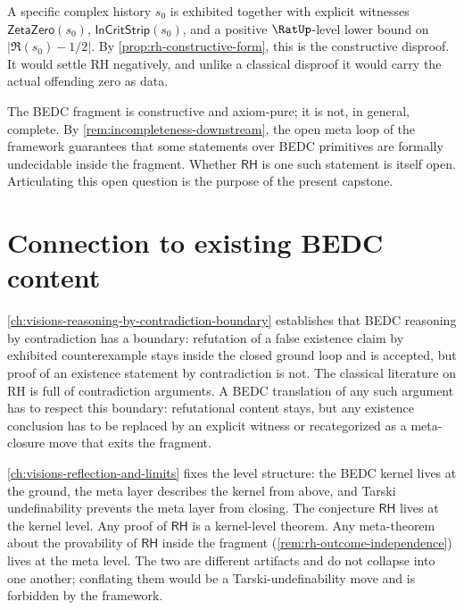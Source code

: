 \begin{remark}
\label{rem:rh-outcome-counterexample}
A specific complex history $s_0$ is exhibited together with explicit witnesses $\mathsf{ZetaZero}(s_0)$, $\mathsf{InCritStrip}(s_0)$, and a positive $\RatUp$-level lower bound on $|\Re(s_0) - 1/2|$. By \autoref{prop:rh-constructive-form}, this is the constructive disproof. It would settle RH negatively, and unlike a classical disproof it would carry the actual offending zero as data.
\end{remark}

\begin{remark}
\label{rem:rh-fragment-undecided}
The BEDC fragment is constructive and axiom-pure; it is not, in general, complete. By \autoref{rem:incompleteness-downstream}, the open meta loop of the framework guarantees that some statements over BEDC primitives are formally undecidable inside the fragment. Whether $\mathsf{RH}$ is one such statement is itself open. Articulating this open question is the purpose of the present capstone.
\end{remark}

\section{Connection to existing BEDC content}
\label{sec:rh-connections}

\begin{remark}
\label{rem:rh-reasoning-by-contradiction}
\autoref{ch:visions-reasoning-by-contradiction-boundary} establishes that BEDC reasoning by contradiction has a boundary: refutation of a false existence claim by exhibited counterexample stays inside the closed ground loop and is accepted, but proof of an existence statement by contradiction is not. The classical literature on RH is full of contradiction arguments. A BEDC translation of any such argument has to respect this boundary: refutational content stays, but any existence conclusion has to be replaced by an explicit witness or recategorized as a meta-closure move that exits the fragment.
\end{remark}

\begin{remark}
\label{rem:rh-reflection}
\autoref{ch:visions-reflection-and-limits} fixes the level structure: the BEDC kernel lives at the ground, the meta layer describes the kernel from above, and Tarski undefinability prevents the meta layer from closing. The conjecture $\mathsf{RH}$ lives at the kernel level. Any proof of $\mathsf{RH}$ is a kernel-level theorem. Any meta-theorem about the provability of $\mathsf{RH}$ inside the fragment (\autoref{rem:rh-outcome-independence}) lives at the meta level. The two are different artifacts and do not collapse into one another; conflating them would be a Tarski-undefinability move and is forbidden by the framework.
\end{remark}


